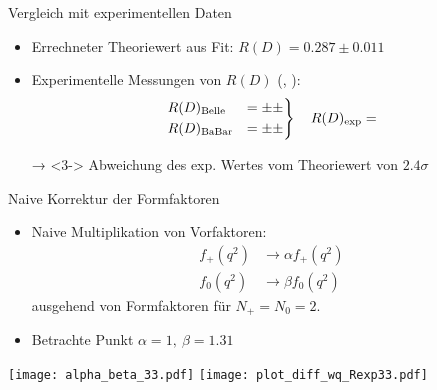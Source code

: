 \documentclass[fleqn, aspectratio=1610, professionalfonts, 9pt]{beamer}
\begin{document}
\begin{frame}{Vergleich mit experimentellen Daten}
  \begin{itemize}
    \setlength\itemsep{1em}
    \item<1-> Errechneter Theoriewert aus Fit: $R(D) = \num{0.287} \pm \num{0.011}$
    \item<2-> Experimentelle Messungen von $R(D)$ (\cite{PhysRevD.92.072014}, \cite{PhysRevLett.109.101802}):
    \begin{align*}
      \begin{drcases}
        R(D)_\text{Belle} &=  \pm  \pm  \\
        R(D)_\text{BaBar} &=  \pm  \pm 
      \end{drcases}
      \quad R(D)_\text{exp} = 
    \end{align*}
    \item[→]<3-> Abweichung des exp. Wertes vom Theoriewert von $\num{2.4}\sigma$
  \end{itemize}
\end{frame}


\begin{frame}{Naive Korrektur der Formfaktoren}
  \begin{minipage}{6cm}
    \begin{itemize}
      \setlength\itemsep{2em}
      \item<2-> Naive Multiplikation von Vorfaktoren:
      \begin{align*}
        f_+(q^2) &\to \alpha f_+(q^2)\\ f_0(q^2) &\to \beta f_0(q^2)
      \end{align*}
      ausgehend von Formfaktoren für $N_+ = N_0 = \num{2}$.
      \item<4-> Betrachte Punkt $\alpha = \num{1}, \: \beta = \num{1.31}$
    \end{itemize}
  \end{minipage}
  \begin{minipage}{8.5cm}
    \begin{overprint}
      \texttt{[image: alpha\_beta\_33.pdf]}
      \texttt{[image: plot\_diff\_wq\_Rexp33.pdf]}
    \end{overprint}
  \end{minipage}%
\end{frame}
\end{document}

